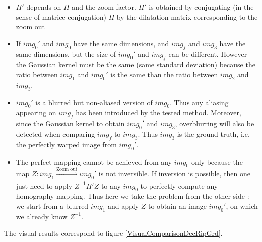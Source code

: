 \begin{remarques}
	\begin{itemize}
		\item $H'$ depends on $H$ and the zoom factor. $H'$ is obtained by conjugating (in the sense of matrice conjugation) $H$ by the dilatation matrix corresponding to the zoom out
		\item If $img_0'$ and $img_0$ have the same dimensions, and $img_f$ and $img_3$ have the same dimensions, but the size of $img_0'$ and $img_f$ can be different. However the Gaussian kernel must be the same (same standard deviation) because the ratio between $img_1$ and $img_0'$ is the same than the ratio between $img_2$ and $img_3$.
		\item $img_0'$ is a blurred but non-aliased version of $img_0$. Thus any aliasing appearing on $img_f$ has been introduced by the tested method. Moreover, since the Gaussian kernel to obtain $img_0'$ and $img_3$, overblurring will also be detected when comparing $img_f$ to $img_3$. Thus $img_3$ is the ground truth, i.e. the perfectly warped image from $img_0'$.
		\item The perfect mapping cannot be achieved from any $img_0$ only because the map $Z : img_1 \xrightarrow[]{\text{Zoom out}} img_0'$ is not inversible. If inversion is possible, then one just need to apply $Z^{-1}H'Z$ to any $img_0$ to perfectly compute any homography mapping. Thus here we take the problem from the other side : we start from a blurred $img_1$ and apply $Z$ to obtain an image $img_0'$, on which we already know $Z^{-1}$.
	\end{itemize}
\end{remarques}

The visual results correspond to figure \ref{VisualComparisonDecRipGrd}.

